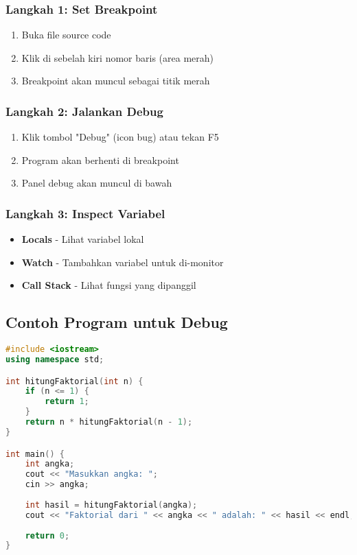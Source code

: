 \subsubsection{Langkah 1: Set Breakpoint}

\begin{enumerate}
\item Buka file source code
\item Klik di sebelah kiri nomor baris (area merah)
\item Breakpoint akan muncul sebagai titik merah
\end{enumerate}

\subsubsection{Langkah 2: Jalankan Debug}

\begin{enumerate}
\item Klik tombol "Debug" (icon bug) atau tekan F5
\item Program akan berhenti di breakpoint
\item Panel debug akan muncul di bawah
\end{enumerate}

\subsubsection{Langkah 3: Inspect Variabel}

\begin{itemize}
\item \textbf{Locals} - Lihat variabel lokal
\item \textbf{Watch} - Tambahkan variabel untuk di-monitor
\item \textbf{Call Stack} - Lihat fungsi yang dipanggil
\end{itemize}

\subsection{Contoh Program untuk Debug}

\begin{lstlisting}[language=c++, caption=Program untuk Latihan Debug]
#include <iostream>
using namespace std;

int hitungFaktorial(int n) {
    if (n <= 1) {
        return 1;
    }
    return n * hitungFaktorial(n - 1);
}

int main() {
    int angka;
    cout << "Masukkan angka: ";
    cin >> angka;
    
    int hasil = hitungFaktorial(angka);
    cout << "Faktorial dari " << angka << " adalah: " << hasil << endl;
    
    return 0;
}
\end{lstlisting}

